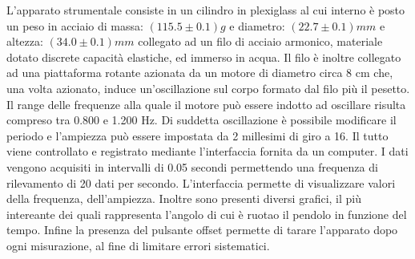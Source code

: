 L’apparato strumentale consiste in un cilindro in plexiglass al cui interno è posto un peso in acciaio di massa: $(115.5 \pm 0.1) g$
 e diametro: $(22.7 \pm 0.1)mm$ e altezza: $(34.0 \pm 0.1)mm$ collegato ad un filo di acciaio armonico, materiale dotato discrete
 capacità elastiche, ed immerso in acqua. Il filo è inoltre collegato ad una piattaforma rotante azionata da un motore di
 diametro circa 8 cm che, una volta azionato, induce un’oscillazione sul corpo formato dal filo più il pesetto. Il range delle
 frequenze alla quale il motore può essere indotto ad oscillare risulta compreso tra 0.800 e 1.200 Hz. Di suddetta oscillazione è
 possibile modificare il periodo e l’ampiezza può essere impostata da 2 millesimi di giro a 16. Il tutto viene controllato e
 registrato mediante l’interfaccia fornita da un computer.
 I dati vengono acquisiti in intervalli di 0.05 secondi permettendo una frequenza di rilevamento di 20 dati per secondo.
 L’interfaccia permette di visualizzare valori della frequenza, dell’ampiezza. Inoltre sono presenti
 diversi grafici, il più intereante dei quali rappresenta l'angolo di cui è ruotao il pendolo in funzione del tempo. Infine la
 presenza del pulsante offset permette di tarare l’apparato dopo ogni misurazione, al fine di limitare errori sistematici.


